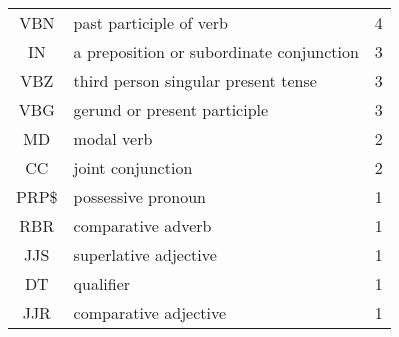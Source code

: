 \documentclass{mcmthesis}
\begin{document}
\begin{appendices}
\begin{table}[H]
\begin{tabular}{cll}
		\rowcolor[gray]{.85}
		VBN & past participle of verb & 4 \\
		IN  & a preposition or subordinate conjunction & 3 \\
		\rowcolor[gray]{.85} 
		VBZ &  third person singular present tense & 3 \\
		VBG  & gerund or present participle & 3 \\
		\rowcolor[gray]{.85}
		MD & modal verb &2 \\
		CC  & joint conjunction & 2 \\
		\rowcolor[gray]{.85}
		PRP\$ &  possessive pronoun & 1 \\
		RBR  &  comparative adverb & 1 \\
		\rowcolor[gray]{.85}
		JJS & superlative adjective &1 \\
		DT  & qualifier &1 \\
		\rowcolor[gray]{.85}
		JJR & comparative adjective &1 \\
		\hline
	\end{tabular}
\end{table}

%

%
%

\end{appendices}
\end{document}
